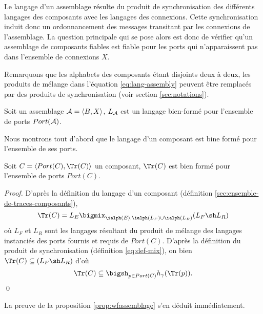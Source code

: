 Le langage d'un assemblage r\'esulte du produit de synchronisation
des diff\'erents langages des composants avec les langages des
connexions. Cette synchronisation induit donc un ordonnancement des
messages transitant par les connexions de l'assemblage.
La question principale qui se pose alors est donc de v\'erifier qu'un assemblage de
composants fiables est fiable pour les ports qui n'apparaissent pas dans
l'ensemble de connexions $X$.

Remarquons que les alphabets des composants \'etant disjoints deux
\`a deux, les produits de m\'elange  dans l'\'equation
\eqref{eq:lang-assembly} peuvent
\^etre remplac\'es par des produits de synchronisation (voir section
\ref{sec:notations}).

\begin{prop}
\label{prop:wfassemblage}
    Soit un  assemblage ${\cal A}=\langle B,X\rangle$, $L_{\cal A}$ est un langage
    bien-form\'e pour l'ensemble de ports $Port({\cal A})$.
\end{prop}

Nous montrons tout d'abord que le langage d'un composant est bine
form\'e pour l'ensemble de ses ports.

\begin{lemma}
\label{lem:wfcomp}
Soit $C=\langle Port(C),\Tr(C)\rangle$ un composant, $\Tr(C)$ est bien
form\'e pour l'ensemble de ports $Port(C)$.    
\end{lemma}

\begin{proof}
D'apr\`es la
d\'efinition du langage d'un composant (d\'efinition
\ref{sec:ensemble-de-traces-composants}),
$$
\Tr(C) = L_E \bigmix_{\ialph(E),\ialph(L_F)\cup \ialph(L_R) } (L_F \sh
L_R)
$$
o\`u $L_F$ et $L_R$ sont les langages r\'esultant du produit de
m\'elange des langages instanci\'es des ports fournis et requis de
$Port(C)$. D'apr\`es la d\'efinition du produit de synchronisation
(d\'efinition \ref{eq:def-mix}), on  bien $\Tr(C)\subseteq (L_F \sh
L_R)$ d'o\`u 
$$
\Tr(C) \subseteq \bigsh_{p\in Port(C)} h_\gamma(\Tr(p)).
$$
 \hfill\qed
\end{proof}

La preuve de la proposition \ref{prop:wfassemblage} s'en d\'eduit
imm\'ediatement.


